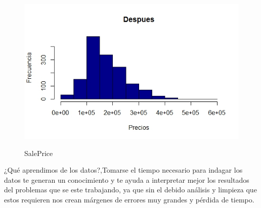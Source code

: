 \documentclass{report}
\begin{document}
\begin{itemize}
\begin{figure}[h]
	\centering
	\includegraphics[scale=0.8]{Precios2.JPEG}
	\label{p1}
	\caption{SalePrice}
\end{figure}

¿Qué aprendimos de los datos?,Tomarse el tiempo necesario para indagar los datos te generan un conocimiento y te ayuda a interpretar mejor los resultados del problemas que se este trabajando, ya que sin el debido análisis y limpieza que estos requieren nos crean márgenes de errores muy grandes y pérdida de tiempo.











\end{itemize}
\end{document}
